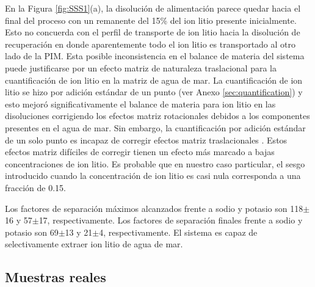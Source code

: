 En la Figura \ref{fig:SSS1}(a), la disolución de alimentación parece quedar hacia el final del proceso con un remanente del 15\% del ion litio presente inicialmente. Esto no concuerda con el perfil de transporte de ion litio hacia la disolución de recuperación en  donde aparentemente todo el ion litio es transportado al otro lado de la PIM. Esta posible inconsistencia en el balance de materia del sistema puede justificarse por un efecto matriz de naturaleza traslacional para la cuantificación de ion litio en la matriz de agua de mar. La cuantificación de ion litio se hizo por adición estándar de un punto (ver Anexo \ref{sec:quantification}) y esto mejoró significativamente el balance de materia para ion litio en las disoluciones corrigiendo los efectos matriz rotacionales debidos a los componentes presentes en el agua de mar. Sin embargo, la cuantificación por adición estándar de un solo punto es incapaz de corregir efectos matriz traslacionales \citep{Ellison2008}. Estos efectos matriz difíciles de corregir tienen un efecto más marcado a bajas concentraciones de ion litio. Es probable que en nuestro caso particular, el sesgo introducido cuando la concentración de ion litio es casi nula corresponda a una fracción de 0.15.

Los factores de separación máximos alcanzados frente a sodio y potasio son 118$\pm$16 y 57$\pm$17, respectivamente. Los factores de separación finales frente a sodio y potasio son 69$\pm$13 y 21$\pm$4, respectivamente. El sistema es capaz de selectivamente extraer ion litio de agua de mar.

\subsection{Muestras reales}
